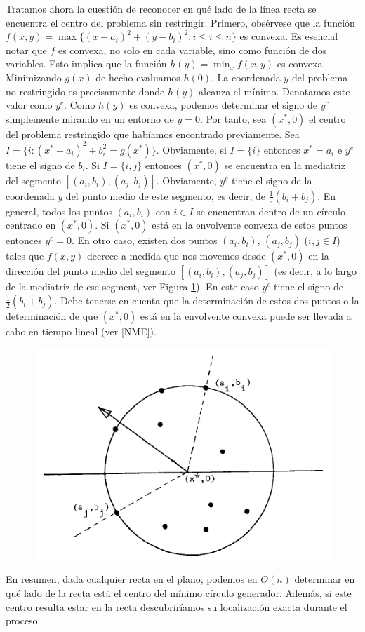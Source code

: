 \documentclass[twoside]{article}
\begin{document}
\begin{solucion}
Tratamos ahora la cuestión de reconocer en qué lado de la línea recta se encuentra el centro del problema sin restringir. Primero, obsérvese que la función $f(x,y)=\max\{(x-a_i)^2+(y-b_i)^2:i\leq i\leq n\}$ es convexa. Es esencial notar que $f$ es convexa, no solo en cada variable, sino como función de dos variables. Esto implica que la función $h(y)=\min_x f(x,y)$ es convexa. Minimizando $g(x)$ de hecho evaluamos $h(0)$. La coordenada $y$ del problema no restringido es precisamente donde $h(y)$ alcanza el mínimo. Denotamos este valor como $y^c$. Como $h(y)$ es convexa, podemos determinar el signo de $y^c$ simplemente mirando en un entorno de $y=0$. Por tanto, sea $(x^*,0)$ el centro del problema restringido que habíamos encontrado previamente. Sea $I=\{i:(x^*-a_i)^2+b_i^2=g(x^*)\}$. Obviamente, si $I=\{i\}$ entonces $x^*=a_i$ e $y^c$ tiene el signo de $b_i$. Si $I=\{i,j\}$ entonces $(x^*,0)$ se encuentra en la mediatriz del segmento $[(a_i,b_i),(a_j,b_j)]$. Obviamente, $y^c$ tiene el signo de la coordenada $y$ del punto medio de este segmento, es decir, de $\frac{1}{2}(b_i+b_j)$. En general, todos los puntos $(a_i,b_i)$ con $i\in I$ se encuentran dentro de un círculo centrado en $(x^*,0)$. Si $(x^*,0)$ está en la envolvente convexa de estos puntos entonces $y^c=0$. En otro caso, existen dos puntos $(a_i,b_i)$, $(a_j,b_j)$ ($i,j\in I$) tales que $f(x,y)$ decrece a medida que nos movemos desde $(x^*,0)$ en la dirección del punto medio del segmento $[(a_i,b_i),(a_j,b_j)]$ (es decir, a lo largo de la mediatriz de ese segment, ver Figura \ref{Fig4}). En este caso $y^c$ tiene el signo de $\frac{1}{2}(b_i+b_j)$. Debe tenerse en cuenta que la determinación de estos dos puntos o la determinación de que $(x^*,0)$ está en la envolvente convexa puede ser llevada a cabo en tiempo lineal (ver [NME]).


\begin{figure}[h!]
\centering
\includegraphics[scale=0.7]{Fig4}
\caption{}\label{Fig4}
\end{figure}
  \newpage
  En resumen, dada cualquier recta en el plano, podemos en $O(n)$ determinar en qué lado de la recta está el centro del mínimo círculo generador. Además, si este centro resulta estar en la recta descubriríamos su localización exacta durante el proceso.\\
  

\end{solucion}
\end{document}

